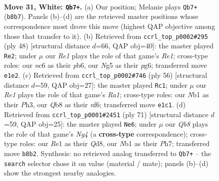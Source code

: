 \documentclass[11pt]{article}
\begin{document}
\clearpage

\begin{figure}[p]\centering
\begin{subfigure}{0.46\textwidth}\centering
\resizebox{\linewidth}{!}{%
\newchessgame
\chessboard[
  setfen={1Q6/6k1/2n3p1/3q1pNp/3p3P/3P2P1/5P2/rN2R1K1 w - - 2 31},
  showmover=false,
  pgfstyle=straightmove, color=movearrow, markmove={b8-b7}
]}
\caption{}
\end{subfigure}\hfill
\begin{subfigure}{0.46\textwidth}\centering
\resizebox{\linewidth}{!}{%
\newchessgame
\chessboard[
  setfen={3q2k1/p4pb1/1p4p1/4r2p/Q3N2P/6P1/PP3P2/4R1K1 w - - 0 25},
  showmover=false,
  pgfstyle=straightmove, color=movearrow, markmove={e1-e2}
]}
\caption{}
\end{subfigure}
\\[4pt]
\begin{subfigure}{0.46\textwidth}\centering
\resizebox{\linewidth}{!}{%
\newchessgame
\chessboard[
  setfen={1k6/1pq3p1/p1p2nQ1/8/PPN4r/7P/5PP1/R6K w - - 1 29},
  showmover=false,
  pgfstyle=straightmove, color=movearrow, markmove={a1-c1}
]}
\caption{}
\end{subfigure}\hfill
\begin{subfigure}{0.46\textwidth}\centering
\resizebox{\linewidth}{!}{%
\newchessgame
\chessboard[
  setfen={3q2k1/7p/p5p1/1p3rn1/6RP/1PP5/1P6/1KN3Q1 b - - 0 36},
  showmover=false,
  pgfstyle=straightmove, color=movearrow, markmove={g5-e6}
]}
\caption{}
\end{subfigure}
\caption{\textbf{Move 31, White: \texttt{Qb7+}.} (a) Our position; Melanie plays \texttt{Qb7+} (\texttt{b8b7}). Panels (b)--(d) are the retrieved master positions whose correspondence most drove this move (highest QAP objective among those that transfer to it). (b) Retrieved from \texttt{ccrl\_top\_p0002\#295} (ply 48) [structural distance $d$=66, QAP obj=40]: the master played \texttt{Re2}; under $\mu$ our \emph{Re1} plays the role of that game's \emph{Re1}; cross-type roles: our \emph{n}c6 as their \emph{p}b6, our \emph{N}g5 as their \emph{p}g6; transferred move \texttt{e1e2}. (c) Retrieved from \texttt{ccrl\_top\_p0002\#746} (ply 56) [structural distance $d$=59, QAP obj=27]: the master played \texttt{Rc1}; under $\mu$ our \emph{Re1} plays the role of that game's \emph{Ra1}; cross-type roles: our \emph{N}b1 as their \emph{P}h3, our \emph{Q}b8 as their \emph{n}f6; transferred move \texttt{e1c1}. (d) Retrieved from \texttt{ccrl\_top\_p0001\#2451} (ply 71) [structural distance $d$=59, QAP obj=25]: the master played \texttt{Ne6}; under $\mu$ our \emph{Qb8} plays the role of that game's \emph{Ng4} (a \textbf{cross-type} correspondence); cross-type roles: our \emph{R}e1 as their \emph{Q}d8, our \emph{N}b1 as their \emph{P}h7; transferred move \texttt{b8b2}. Synthesis: no retrieved analog transferred to \texttt{Qb7+} -- the \texttt{search} selector chose it on value (material / mate); panels (b)--(d) show the strongest nearby analogies.}
\label{fig:thought-m60}
\end{figure}
\end{document}
